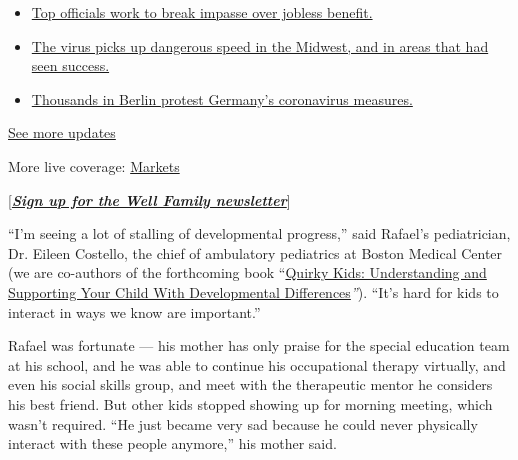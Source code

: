 \begin{itemize}
\tightlist
\item
  \href{https://www.nytimes3xbfgragh.onion/2020/08/01/world/coronavirus-covid-19.html?action=click\&pgtype=Article\&state=default\&region=MAIN_CONTENT_1\&context=storylines_live_updates\#link-3ac56579}{Top
  officials work to break impasse over jobless benefit.}
\item
  \href{https://www.nytimes3xbfgragh.onion/2020/08/01/world/coronavirus-covid-19.html?action=click\&pgtype=Article\&state=default\&region=MAIN_CONTENT_1\&context=storylines_live_updates\#link-8796723}{The
  virus picks up dangerous speed in the Midwest, and in areas that had
  seen success.}
\item
  \href{https://www.nytimes3xbfgragh.onion/2020/08/01/world/coronavirus-covid-19.html?action=click\&pgtype=Article\&state=default\&region=MAIN_CONTENT_1\&context=storylines_live_updates\#link-25930521}{Thousands
  in Berlin protest Germany's coronavirus measures.}
\end{itemize}

\href{https://www.nytimes3xbfgragh.onion/2020/08/01/world/coronavirus-covid-19.html?action=click\&pgtype=Article\&state=default\&region=MAIN_CONTENT_1\&context=storylines_live_updates}{See
more updates}

More live coverage:
\href{https://www.nytimes3xbfgragh.onion/live/2020/07/31/business/stock-market-today-coronavirus?action=click\&pgtype=Article\&state=default\&region=MAIN_CONTENT_1\&context=storylines_live_updates}{Markets}

{[}\textbf{\href{https://www.nytimes3xbfgragh.onion/newsletters/well-family}{\emph{Sign
up for the Well Family newsletter}}}{]}

``I'm seeing a lot of stalling of developmental progress,'' said
Rafael's pediatrician, Dr. Eileen Costello, the chief of ambulatory
pediatrics at Boston Medical Center (we are co-authors of the
forthcoming book
``\href{https://shop.aap.org/quirky-kids-2nd-edition-paperback/}{Quirky
Kids: Understanding and Supporting Your Child With Developmental
Differences}\emph{''}). ``It's hard for kids to interact in ways we know
are important.''

Rafael was fortunate --- his mother has only praise for the special
education team at his school, and he was able to continue his
occupational therapy virtually, and even his social skills group, and
meet with the therapeutic mentor he considers his best friend. But other
kids stopped showing up for morning meeting, which wasn't required. ``He
just became very sad because he could never physically interact with
these people anymore,'' his mother said.

